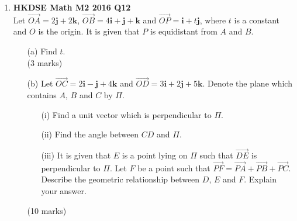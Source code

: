 \documentclass{report}
\begin{document}
\begin{enumerate}
	\item \textbf{HKDSE Math M2 2016 Q12}\\
	Let $\overrightarrow{OA} = 2 \textbf{j} +2\textbf {k}$, 
		$\overrightarrow{OB} = 4\textbf{i} + \textbf{j} + \textbf {k}$ and 
		$\overrightarrow{OP} = \textbf{i} +t \textbf{j}$, where $t$ is a constant and $O$ is the origin. It is given that $P$ is equidistant from $A$ and $B$. 
	\begin{enumerate}
		\item [(a)]Find $t$.\\(3 marks)
		\item [(b)]Let $\overrightarrow{OC} = 2 \textbf{i} - \textbf{j} +4\textbf {k}$ and $\overrightarrow{OD} = 3 \textbf{i} +2 \textbf{j} +5\textbf {k}$. Denote the plane which contains $A$, $B$ and $C$ by $\Pi$.
		\begin{enumerate}
			\item [(i)]Find a unit vector which is perpendicular to $\Pi$. 
			\item [(ii)]Find the angle between $CD$ and  $\Pi$. 
			\item [(iii)]It is given that $E$ is a point lying on $\Pi$ such that 
			$\overrightarrow{DE}$ is perpendicular to $\Pi$. Let $F$ be a point such that $\overrightarrow{PF} = \overrightarrow{PA} + \overrightarrow{PB} + \overrightarrow{PC}$. Describe the geometric relationship between $D$, $E$ and $F$. Explain your answer.
		\end{enumerate}
		(10 marks)
	\end{enumerate}

\end{enumerate}
\end{document}
